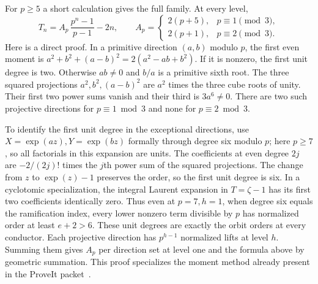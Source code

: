 For $p\ge5$ a short calculation gives the full family. At every level,
\[
 T_n=A_p\,\frac{p^n-1}{p-1}-2n,\qquad
 A_p=\begin{cases}
 2(p+5),&p\equiv1\pmod3,\\
 2(p+1),&p\equiv2\pmod3 .
 \end{cases}
\]
Here is a direct proof. In a primitive direction $(a,b)$ modulo $p$, the first even moment is $a^2+b^2+(a-b)^2=2(a^2-ab+b^2)$. If it is nonzero, the first unit degree is two. Otherwise $ab\ne0$ and $b/a$ is a primitive sixth root. The three squared projections $a^2,b^2,(a-b)^2$ are $a^2$ times the three cube roots of unity. Their first two power sums vanish and their third is $3a^6\ne0$. There are two such projective directions for $p\equiv1\bmod3$ and none for $p\equiv2\bmod3$.

To identify the first unit degree in the exceptional directions, use $X=\exp(az),Y=\exp(bz)$ formally through degree six modulo $p$; here $p\ge7$, so all factorials in this expansion are units. The coefficients at even degree $2j$ are $-2/(2j)!$ times the $j$th power sum of the squared projections. The change from $z$ to $\exp(z)-1$ preserves the order, so the first unit degree is six. In a cyclotomic specialization, the integral Laurent expansion in $T=\zeta-1$ has its first two coefficients identically zero. Thus even at $p=7,h=1$, when degree six equals the ramification index, every lower nonzero term divisible by $p$ has normalized order at least $e+2>6$. These unit degrees are exactly the orbit orders at every conductor. Each projective direction has $p^{h-1}$ normalized lifts at level $h$. Summing them gives $A_p$ per direction set at level one and the formula above by geometric summation. This proof specializes the moment method already present in the ProveIt packet~\cite{incoming}.
